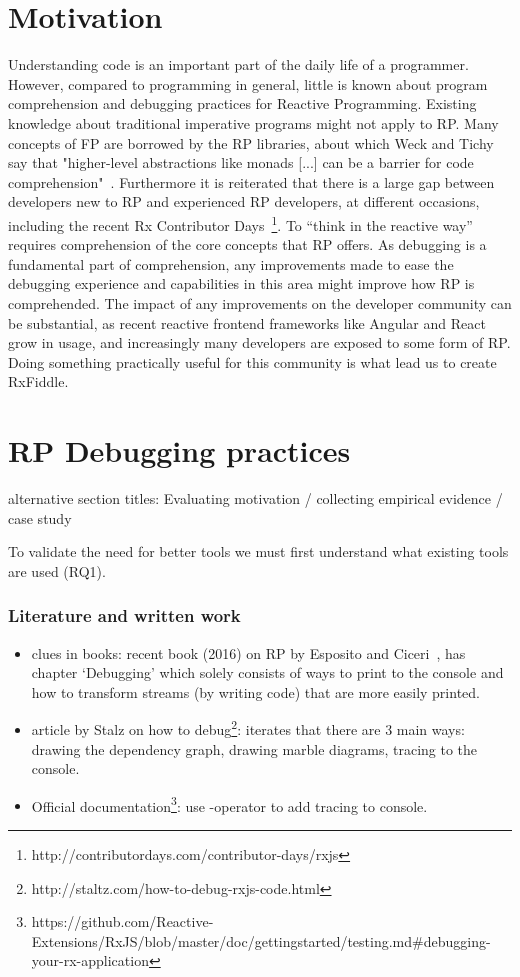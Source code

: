 \section{Motivation}
Understanding code is an important part of the daily life of a programmer. However, compared to programming in general, little is known about program comprehension and debugging practices for Reactive Programming. Existing knowledge about traditional imperative programs might not apply to RP. Many concepts of FP are borrowed by the RP libraries, about which Weck and Tichy say that "higher-level abstractions like monads [...] can be a barrier for code comprehension"~\cite{weck2016visualizing}. Furthermore it is reiterated that there is a large gap between developers new to RP and experienced RP developers, at different occasions, including the recent Rx Contributor Days~\footnote{http://contributordays.com/contributor-days/rxjs}. To ``think in the reactive way'' requires comprehension of the core concepts that RP offers. As debugging is a fundamental part of comprehension, any improvements made to ease the debugging experience and capabilities in this area might improve how RP is comprehended.
The impact of any improvements on the developer community can be substantial, as recent reactive frontend frameworks like Angular and React grow in usage, and increasingly many developers are exposed to some form of RP. Doing something practically useful for this community is what lead us to create RxFiddle.

\section{RP Debugging practices}
{\color{red} alternative section titles: Evaluating motivation / collecting empirical evidence / case study}

To validate the need for better tools we must first understand what existing tools are used (RQ1).

\subsubsection{Literature and written work}
\begin{itemize}
	\item clues in books: recent book (2016) on RP by Esposito and Ciceri~\cite{esposito2016reactive}, has chapter `Debugging' which solely consists of ways to print to the console and how to transform streams (by writing code) that are more easily printed.
	\item article by Stalz on how to debug\footnote{http://staltz.com/how-to-debug-rxjs-code.html}: iterates that there are 3 main ways: drawing the dependency graph, drawing marble diagrams, tracing to the console.
	\item Official documentation\footnote{https://github.com/Reactive-Extensions/RxJS/blob/master/doc/gettingstarted/testing.md\#debugging-your-rx-application}: use -operator to add tracing to console.
\end{itemize}

